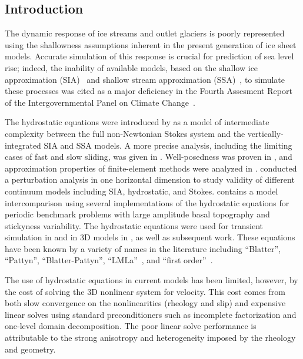 \documentclass[draft,lineno,jgrga]{AGUTeX}
\begin{document}
\begin{article}
\section{Introduction}
The dynamic response of ice streams and outlet glaciers is poorly represented using the shallowness
assumptions inherent in the present generation of ice sheet models.  Accurate simulation of this
response is crucial for prediction of sea level rise; indeed, the inability of available models, based on
the shallow ice approximation (SIA)~\citep{hutter1983tgm} and shallow stream approximation
(SSA)~\citep{morland1987unconfined,weis1999theory}, to simulate these processes was cited as a major
deficiency in the Fourth Assesment Report of the Intergovernmental Panel on Climate Change~\citep{ipcc2007ar4-syr}.

The hydrostatic equations were introduced by \cite{blatter1995vas} as a model of intermediate complexity between the full non-Newtonian Stokes system and the vertically-integrated SIA and SSA models.
A more precise analysis, including the limiting cases of fast and slow sliding, was given in \cite{schoof2010thin}.
Well-posedness was proven in \cite{colinge1999strongly}, and approximation properties of finite-element methods were analyzed in \cite{glowinski2003approximation,chow2004finite}.
\cite{hindmarsh2004numerical} conducted a perturbation analysis in one horizontal dimension to study validity of different continuum models including SIA, hydrostatic, and Stokes.
\cite{pattyn2008beh} contains a model intercomparison using several implementations of the hydrostatic equations for periodic benchmark problems with large amplitude basal topography and stickyness variability.
The hydrostatic equations were used for transient simulation in \cite{pattyn2002tgr} and in 3D models in \cite{pattyn2003ntd}, as well as subsequent work.
These equations have been known by a variety of names in the literature including ``Blatter'', ``Pattyn'', ``Blatter-Pattyn'', ``LMLa''~\citep{hindmarsh2004numerical}, and ``first order''~\citep{greve2009dynamics}.

The use of hydrostatic equations in current models has been limited, however, by the cost of solving the 3D nonlinear system for velocity.  This cost comes from both slow convergence on the
nonlinearities (rheology and slip) and expensive linear solves using standard preconditioners such
as incomplete factorization and one-level domain decomposition.  The poor linear solve performance is
attributable to the strong anisotropy and heterogeneity imposed by the rheology and geometry.


\end{article}
\end{document}
